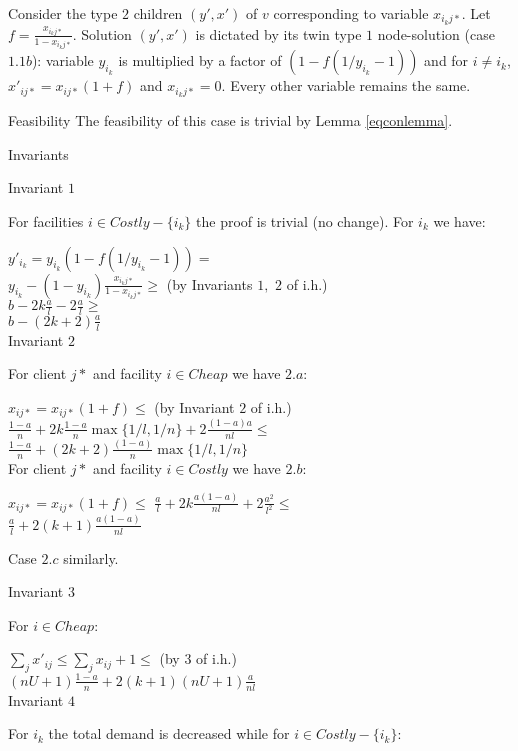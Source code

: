 \documentclass[11pt]{article}\usepackage{amsmath}
\begin{document}
Consider the type $2$ children $(y',x')$ of $v$ corresponding to variable $x_{i_kj*}$. 
Let $f=\frac{x_{i_kj*}}{1-x_{i_kj*}}$. Solution $(y',x')$ is dictated by its twin type $1$ node-solution (case $1.1b$):
variable $y_{i_k}$ is multiplied by a factor of $(1-f(1/y_{i_k}-1))$ and  for $i\neq i_k$, $x'_{ij*}=x_{ij*}(1+f)$ and
  $x_{i_kj*}=0$. Every other variable remains the same.


{\sc Feasibility}
The feasibility of this case is trivial by Lemma \ref{eqconlemma}.

{\sc Invariants}

{\sf Invariant $1$}

For facilities $i\in Costly-\{i_k\}$ the proof is trivial (no change).
For $i_k$ we have:

\noindent
$y'_{i_k}=y_{i_k}(1-f(1/y_{i_k}-1))=$\\
$y_{i_k}-(1-y_{i_k})\frac{x_{i_kj*}}{1-x_{i_kj*}}\geq$ \hfill (by Invariants $1,$ $2$ of i.h.) \\
$b-2k\frac{a}{l}-2\frac{a}{l}\geq$\\
$b-(2k+2)\frac{a}{l}$\\

{\sf Invariant $2$}

For client $j*$ and facility $i\in Cheap$ we have $2.a$:

\noindent
$x_{ij*}=x_{ij*}(1+f)\leq$ \hfill (by Invariant $2$ of i.h.)\\
$\frac{1-a}{n}+2k\frac{1-a}{n}\max\{1/l,1/n\}+2\frac{(1-a)a}{nl}\leq$\\
$\frac{1-a}{n}+(2k+2)\frac{(1-a)}{n}\max\{1/l,1/n\}$\\

For client $j*$ and facility $i\in Costly$ we have $2.b$:

\noindent
$x_{ij*}=x_{ij*}(1+f)\leq$
$\frac{a}{l}+2k\frac{a(1-a)}{nl}+2\frac{a^2}{l^2}\leq$\\
$\frac{a}{l}+2(k+1)\frac{a(1-a)}{nl}$

Case $2.c$ similarly.

{\sf Invariant $3$}

For $i\in Cheap$:

\noindent
$\sum_j x'_{ij}\leq \sum_j x_{ij} + 1\leq$ \hfill (by $3$ of i.h.)\\
$(nU+1)\frac{1-a}{n}+2(k+1)(nU+1)\frac{a}{nl}$\\

{\sf Invariant $4$}

For $i_k$ the total demand is decreased while for $i\in
Costly-\{i_k\}$:
\end{document}
